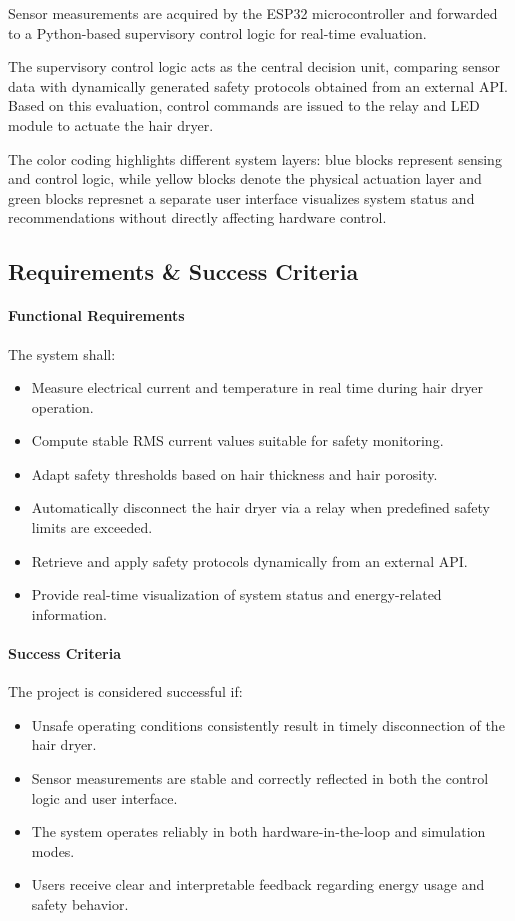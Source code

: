 \documentclass[11pt,a4paper]{article}
\begin{document}
Sensor measurements are acquired by the ESP32 microcontroller and forwarded to a Python-based supervisory control logic for real-time evaluation.

The supervisory control logic acts as the central decision unit, comparing sensor data with dynamically generated safety protocols obtained from an external API. Based on this evaluation, control commands are issued to the relay and LED module to actuate the hair dryer.

The color coding highlights different system layers: blue blocks represent sensing and control logic, while yellow blocks denote the physical actuation layer and green
blocks represnet a separate user interface visualizes system status and recommendations without directly affecting hardware control.
\subsection{Requirements \& Success Criteria}


\paragraph{Functional Requirements}
The system shall:
\begin{itemize}
  \item Measure electrical current and temperature in real time during hair dryer operation.
  \item Compute stable RMS current values suitable for safety monitoring.
  \item Adapt safety thresholds based on hair thickness and hair porosity.
  \item Automatically disconnect the hair dryer via a relay when predefined safety limits are exceeded.
  \item Retrieve and apply safety protocols dynamically from an external API.
  \item Provide real-time visualization of system status and energy-related information.
\end{itemize}


\paragraph{Success Criteria}
The project is considered successful if:
\begin{itemize}
  \item Unsafe operating conditions consistently result in timely disconnection of the hair dryer.
  \item Sensor measurements are stable and correctly reflected in both the control logic and user interface.
  \item The system operates reliably in both hardware-in-the-loop and simulation modes.
  \item Users receive clear and interpretable feedback regarding energy usage and safety behavior.
\end{itemize}
\end{document}

